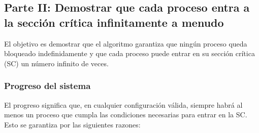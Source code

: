\documentclass[a4paper,12pt]{article}
\begin{document}
\subsection{Parte II: Demostrar que cada proceso entra a la sección crítica infinitamente a menudo}

El objetivo es demostrar que el algoritmo garantiza que ningún proceso queda bloqueado indefinidamente y que cada proceso puede entrar en su sección crítica (SC) un número infinito de veces.

\subsubsection{Progreso del sistema}

El progreso significa que, en cualquier configuración válida, siempre habrá al menos un proceso que cumpla las condiciones necesarias para entrar en la SC. Esto se garantiza por las siguientes razones:
\end{document}
